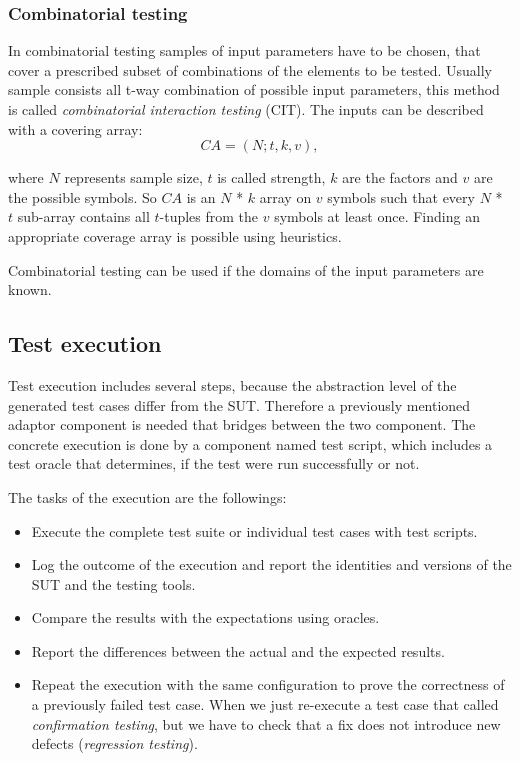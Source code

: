 
\subsubsection{Combinatorial testing}
\label{ssub:combinatorialtesting}

In combinatorial testing samples of input parameters have to be chosen, that cover a prescribed subset of combinations of the elements to be tested. Usually sample consists all t-way combination of possible input parameters, this method is called \textit{combinatorial interaction testing} (CIT). The inputs can be described with a covering array:
\begin{displaymath}
CA=(N;t, k, v),
\end{displaymath}

where $N$ represents sample size, $t$ is called strength, $k$ are the factors and $v$ are the possible symbols. So $CA$ is an $N$ * $k$ array on $v$ symbols such that every $N$ * $t$ sub-array contains all $t$-tuples from the $v$ symbols at least once. Finding an appropriate coverage array is possible using heuristics.

Combinatorial testing can be used if the domains of the input parameters are known.



\subsection{Test execution}
\label{sub:testexecution}

Test execution includes several steps, because the abstraction level of the generated test cases differ from the SUT. Therefore a previously mentioned adaptor component is needed that bridges between the two component. The concrete execution is done by a component named test script, which includes a test oracle that determines, if the test were run successfully or not.

The tasks of the execution are the followings:

\begin{itemize}
	\item Execute the complete test suite or individual test cases with test scripts.
	\item Log the outcome of the execution and report the identities and versions of the SUT and the testing tools.
	\item Compare the results with the expectations using oracles.
	\item Report the differences between the actual and the expected results.
	\item Repeat the execution with the same configuration to prove the correctness of a previously failed test case. When we just re-execute a test case that called \textit{confirmation testing}, but we have to check that a fix does not introduce new defects (\textit{regression testing}).
\end{itemize}



